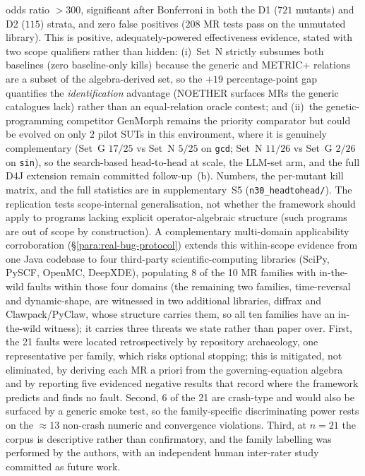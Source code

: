 \documentclass[acmsmall,screen,review]{acmart}
\begin{document}
odds ratio $> 300$, significant after Bonferroni in both the D1 ($721$ mutants) and D2 ($115$) strata, and zero false positives ($208$ MR tests pass on the unmutated library). This is positive, adequately-powered effectiveness evidence, stated with two scope qualifiers rather than hidden: (i)~Set~N strictly subsumes both baselines (zero baseline-only kills) because the generic and METRIC+ relations are a subset of the algebra-derived set, so the $+19$ percentage-point gap quantifies the \emph{identification} advantage (NOETHER surfaces MRs the generic catalogues lack) rather than an equal-relation oracle contest; and (ii)~the genetic-programming competitor GenMorph remains the priority comparator but could be evolved on only $2$ pilot SUTs in this environment, where it is genuinely complementary (Set~G $17/25$ vs Set~N $5/25$ on \texttt{gcd}; Set~N $11/26$ vs Set~G $2/26$ on \texttt{sin}), so the search-based head-to-head at scale, the LLM-set arm, and the full D4J extension remain committed follow-up~(b). Numbers, the per-mutant kill matrix, and the full statistics are in supplementary~S5 (\texttt{n30\_headtohead/}). The replication tests scope-internal generalisation, not whether the framework should apply to programs lacking explicit operator-algebraic structure (such programs are out of scope by construction). A complementary multi-domain applicability corroboration (\S\ref{para:real-bug-protocol}) extends this within-scope evidence from one Java codebase to four third-party scientific-computing libraries (SciPy, PySCF, OpenMC, DeepXDE), populating 8 of the 10 MR families with in-the-wild faults within those four domains (the remaining two families, time-reversal and dynamic-shape, are witnessed in two additional libraries, diffrax and Clawpack/PyClaw, whose structure carries them, so all ten families have an in-the-wild witness); it carries three threats we state rather than paper over. First, the 21 faults were located retrospectively by repository archaeology, one representative per family, which risks optional stopping; this is mitigated, not eliminated, by deriving each MR a priori from the governing-equation algebra and by reporting five evidenced negative results that record where the framework predicts and finds no fault. Second, 6 of the 21 are crash-type and would also be surfaced by a generic smoke test, so the family-specific discriminating power rests on the $\approx 13$ non-crash numeric and convergence violations. Third, at $n = 21$ the corpus is descriptive rather than confirmatory, and the family labelling was performed by the authors, with an independent human inter-rater study committed as future work.
\end{document}
